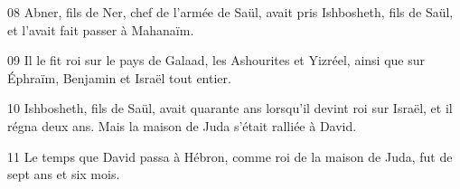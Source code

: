 
08 Abner, fils de Ner, chef de l’armée de Saül, avait pris Ishbosheth, fils de Saül, et l’avait fait passer à Mahanaïm.

09 Il le fit roi sur le pays de Galaad, les Ashourites et Yizréel, ainsi que sur Éphraïm, Benjamin et Israël tout entier.

10 Ishbosheth, fils de Saül, avait quarante ans lorsqu’il devint roi sur Israël, et il régna deux ans. Mais la maison de Juda s’était ralliée à David.

11 Le temps que David passa à Hébron, comme roi de la maison de Juda, fut de sept ans et six mois.
